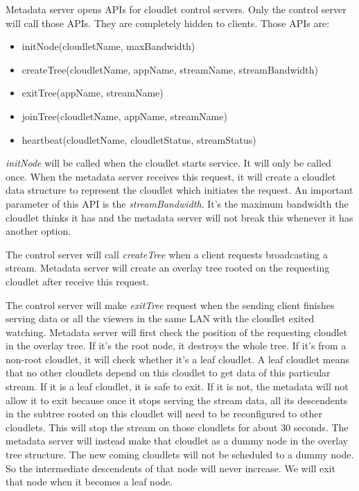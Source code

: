 \documentclass[letterpaper,twocolumn,10pt]{article}
\begin{document}
Metadata server opens APIs for cloudlet control servers. Only the control server will call those APIs. They are completely hidden to clients. Those APIs are:

\begin{itemize}
  \item initNode(cloudletName, maxBandwidth)
  \item createTree(cloudletName, appName, streamName, streamBandwidth)
  \item exitTree(appName, streamName)
  \item joinTree(cloudletName, appName, streamName)
  \item heartbeat(cloudletName, cloudletStatus, streamStatus)
\end{itemize}

\emph{initNode} will be called when the cloudlet starts service. It will only be called once. When the metadata server receives this request, it will create a cloudlet data structure to represent the cloudlet which initiates the request. An important parameter of this API is the \emph{streamBandwidth}. It's the maximum bandwidth the cloudlet thinks it has and the metadata server will not break this whenever it has another option.

The control server will call \emph{createTree} when a client requests broadcasting a stream. Metadata server will create an overlay tree rooted on the requesting cloudlet after receive this request.

The control server will make \emph{exitTree} request when the sending client finishes serving data or all the viewers in the same LAN with the cloudlet exited watching. Metadata server will first check the position of the requesting cloudlet in the overlay tree. If it's the root node, it destroys the whole tree. If it's from a non-root cloudlet, it will check whether it's a leaf cloudlet. A leaf cloudlet means that no other cloudlets depend on this cloudlet to get data of this particular stream. If it is a leaf cloudlet, it is safe to exit. If it is not, the metadata will not allow it to exit because once it stops serving the stream data, all its descendents in the subtree rooted on this cloudlet will need to be reconfigured to other cloudlets. This will stop the stream on those cloudlets for about 30 seconds. The metadata server will instead make that cloudlet as a dummy node in the overlay tree structure. The new coming cloudlets will not be scheduled to a dummy node. So the intermediate descendents of that node will never increase. We will exit that node when it becomes a leaf node. 
\end{document}
